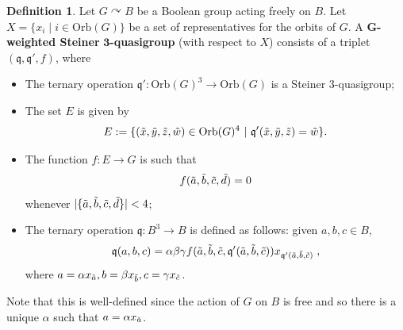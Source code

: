 \documentclass{article}
\theoremstyle{remark}
\theoremstyle{definition}
\newtheorem{definition}[theorem]{Definition}
\def\acts{\curvearrowright}
\begin{document}
\begin{definition}\label{def:gweighted} Let $G\acts B$ be a Boolean group acting freely on $B$. Let $X=\{ x_i \;\vert\; i\in \mathrm{Orb}(G)\}$ be a set of representatives for the orbits of $G$. 
A $\bm{G}$\textbf{-weighted Steiner} $\bm{3}$\textbf{-quasigroup} (with respect to $X$) consists of a triplet 
$(\mathfrak{q}, \mathfrak{q}', f)$, where 
\begin{itemize}
\item The ternary operation $\mathfrak{q}': \mathrm{Orb}(G)^3\to \mathrm{Orb}(G)$ is a Steiner $3$-quasigroup;
\item The set $E$ is given by
\[E:=\{(\Tilde{x}, \Tilde{y}, \Tilde{z}, \Tilde{w})\in\mathrm{Orb}(G)^4\ \vert \ \mathfrak{q}'(\Tilde{x}, \Tilde{y}, \Tilde{z})= \Tilde{w}\}.\]
    \item The function $f:E\to G$ is such that
    \begin{equation}\label{eq:fis0}
        f(\Tilde{a}, \Tilde{b}, \Tilde{c},\Tilde{d})=0
    \end{equation}
whenever $|\{\Tilde{a}, \Tilde{b}, \Tilde{c},\Tilde{d}\}|<4$;
\item The ternary operation $\mathfrak{q}:B^3\to B$ is defined as follows: given $a,b,c\in B$, 
\begin{equation}\label{eq:gweighted}
    \mathfrak{q}(a, b, c)=\alpha \beta \gamma f(\Tilde{a},\Tilde{b}, \Tilde{c}, \mathfrak{q}'(\Tilde{a},\Tilde{b}, \Tilde{c})) x_{\mathfrak{q}'(\Tilde{a},\Tilde{b}, \Tilde{c})} \;, 
\end{equation}
    where $a=\alpha x_{\Tilde{a}}, b=\beta x_{\Tilde{b}}, c=\gamma x_{\Tilde{c}}$.
\end{itemize}
    Note that this is well-defined since the action of $G$ on $B$ is free and so there is a unique $\alpha$ such that  $a=\alpha x_{\Tilde{a}}$.  
\end{definition}
\end{document}
